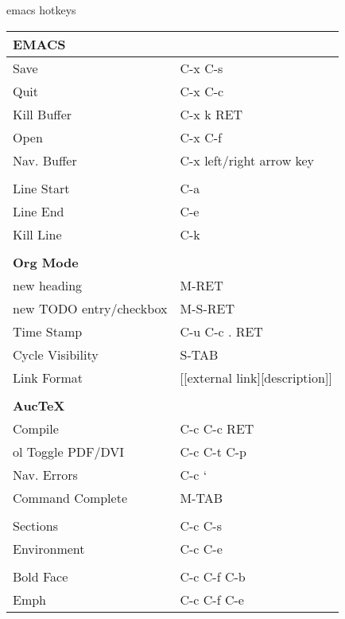 \documentclass[12pt,letterpaper,oneside]{article}
\begin{document}
\sffamily
\begin{center} \huge emacs hotkeys \end{center}

\begin{center}
\begin{tabular}{l l}
\textbf{EMACS} & \\ \hline
Save & C-x C-s \\ \hline 
Quit & C-x C-c \\ \hline 
Kill Buffer & C-x k RET \\ \hline
Open & C-x C-f \\ \hline
Nav. Buffer & C-x left/right arrow key\\ \hline
&\\
Line Start & C-a \\ \hline
Line End & C-e \\ \hline 
Kill Line & C-k \\ \hline
& \\
\textbf{Org Mode} & \\ \hline 
new heading & M-RET \\ \hline
new TODO entry/checkbox & M-S-RET\\ \hline 
Time Stamp & C-u C-c . RET \\ \hline
Cycle Visibility & S-TAB \\ \hline
Link Format & [[external link][description]] \\ \hline
&\\
\textbf{AucTeX} \\ \hline 
Compile & C-c C-c RET \\ \hline ol
Toggle PDF/DVI & C-c C-t C-p \\ \hline
Nav. Errors & C-c ` \\ \hline 
Command Complete & M-TAB \\ \hline
& \\ 
Sections & C-c C-s \\ \hline
Environment & C-c C-e \\ \hline 
& \\
Bold Face & C-c C-f C-b \\ \hline
Emph & C-c C-f C-e \\ \hline


\end{tabular}
\end{center}
\end{document}
